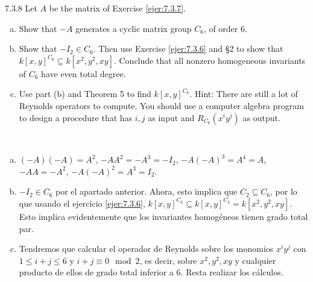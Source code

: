\documentclass[twoside]{article}
\begin{document}
\begin{ejercicio}{7.3.8}
Let $A$ be the matrix of Exercise \ref{ejer:7.3.7}.
\begin{enumerate}[a.]
\item Show that $−A$ generates a cyclic matrix group $C_6$, of order 6.
\item Show that $−I_2 ∈ C_6$. Then use Exercise \ref{ejer:7.3.6} and §2 to show that $k[x, y]^{C_6} ⊆ k[x^2, y^2, xy]$.
Conclude that all nonzero homogeneous invariants of $C_6$ have even total degree.
\item Use part (b) and Theorem 5 to find $k[x, y]^{C_6}$. Hint: There are still a lot of Reynolds
operators to compute. You should use a computer algebra program to design a procedure
that has $i, j$ as input and $R_{C_6} (x^iy^j)$ as output.
\end{enumerate}
\end{ejercicio}
\begin{solucion}\
\begin{enumerate}[a.]
\item $(-A)(-A)=A^2$, $-AA^2=-A^3=-I_2$, $-A(-A)^3=A^4=A$, $-AA=-A^2$, $-A(-A)^2=A^3=I_2$. 
\item $-I_2\in C_6$ por el apartado anterior. Ahora, esto implica que $C_2\subseteq C_6$, por lo que usando el ejercicio \ref{ejer:7.3.6}, $k[x, y]^{C_6} ⊆ k[x,y]^{C_2}=k[x^2, y^2, xy]$. Esto implica evidentemente que los invariantes homogéneos tienen grado total par.
\item Tendremos que calcular el operador de Reynolds sobre los monomios $x^iy^j$ con $1\leq i+j\leq 6$ y $i+j\equiv 0\mod 2$, es decir, sobre $x^2,y^2,xy$ y cualquier producto de ellos de grado total inferior a 6. Resta realizar los cálculos.
\end{enumerate}
\end{solucion}

\newpage
\end{document}
